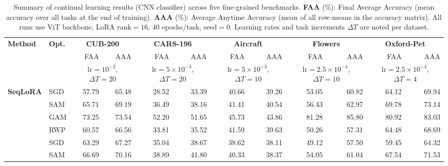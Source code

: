 
\begin{table}[ht]
\centering
\caption{%
  Summary of continual learning results (CNN classifier) across five fine-grained
  benchmarks.
  \textbf{FAA} (\%): Final Average Accuracy (mean accuracy over all tasks at the
  end of training).
  \textbf{AAA} (\%): Average Anytime Accuracy (mean of all row-means in the
  accuracy matrix).
  All runs use ViT backbone, LoRA rank$=16$, 40 epochs/task, seed$=0$.
  Learning rates and task increments $\Delta T$ are noted per dataset.
}
\label{tab:combine_cnn_detailed}
\setlength{\tabcolsep}{3.5pt}
\renewcommand{\arraystretch}{0.90}
\scriptsize
\begin{tabular}{@{}l l r r r r r r r r r r@{}}
\toprule
\textbf{Method} & \textbf{Opt.} & \multicolumn{2}{c}{\textbf{CUB-200}} & \multicolumn{2}{c}{\textbf{CARS-196}} & \multicolumn{2}{c}{\textbf{Aircraft}} & \multicolumn{2}{c}{\textbf{Flowers}} & \multicolumn{2}{c}{\textbf{Oxford-Pet}} \\
\cmidrule(lr){3-4}\cmidrule(lr){5-6}\cmidrule(lr){7-8}\cmidrule(lr){9-10}\cmidrule(lr){11-12}
 &  & FAA & AAA & FAA & AAA & FAA & AAA & FAA & AAA & FAA & AAA \\
 &  & \multicolumn{2}{c}{\scriptsize lr$=10^{-2}$, $\Delta T=20$} & \multicolumn{2}{c}{\scriptsize lr$=5\times10^{-3}$, $\Delta T=20$} & \multicolumn{2}{c}{\scriptsize lr$=5\times10^{-3}$, $\Delta T=10$} & \multicolumn{2}{c}{\scriptsize lr$=2.5\times10^{-4}$, $\Delta T=10$} & \multicolumn{2}{c}{\scriptsize lr$=2.5\times10^{-4}$, $\Delta T=4$} \\
\midrule
\multirow{4}{*}{\textbf{SeqLoRA}} & SGD & 57.79 & 65.48 & 28.52 & 33.39 & 40.66 & 39.26 & 53.05 & 60.82 & 64.12 & 69.94 \\
 & SAM & 65.71 & 69.19 & 36.49 & 38.16 & 41.41 & 40.54 & 56.43 & 62.97 & 69.78 & 73.14 \\
 & GAM & 73.25 & 73.54 & 52.20 & 51.65 & 45.73 & 43.86 & 81.28 & 85.80 & 80.92 & 83.03 \\
 & RWP & 60.57 & 66.56 & 33.81 & 35.52 & 41.59 & 39.63 & 50.26 & 57.31 & 64.48 & 68.69 \\
\addlinespace[3pt]
\multirow{4}{*}{\textbf{IncLoRA}} & SGD & 63.29 & 67.27 & 35.04 & 38.67 & 38.62 & 38.11 & 49.12 & 57.50 & 59.45 & 64.32 \\
 & SAM & 66.69 & 70.16 & 38.89 & 41.80 & 40.33 & 38.37 & 54.05 & 61.04 & 67.54 & 71.53 \\

\end{tabular}
\end{table}
